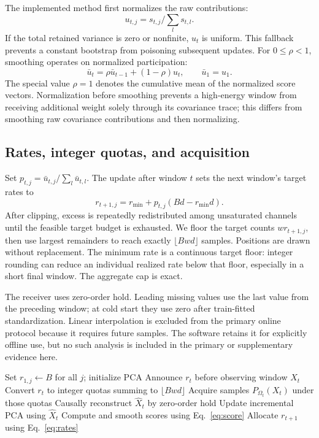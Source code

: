 \documentclass[pdflatex,sn-vancouver-num]{sn-jnl}
\theoremstyle{thmstyleone}
\begin{document}
The implemented method first normalizes the raw contributions:
\begin{equation}
 u_{t,j}=s_{t,j}/\sum_l s_{t,l}.
\end{equation}
If the total retained variance is zero or nonfinite, $u_t$ is uniform. This
fallback prevents a constant bootstrap from poisoning subsequent updates.
For $0\leq\rho<1$, smoothing operates on normalized participation:
\begin{equation}
 \bar u_t=\rho\bar u_{t-1}+(1-\rho)u_t,
 \qquad \bar u_1=u_1.
\end{equation}
The special value $\rho=1$ denotes the cumulative mean of the normalized score
vectors. Normalization before smoothing prevents a high-energy window from
receiving additional weight solely through its covariance trace; this differs
from smoothing raw covariance contributions and then normalizing.

\subsection{Rates, integer quotas, and acquisition}

Set $p_{t,j}=\bar u_{t,j}/\sum_l\bar u_{t,l}$. The update after window $t$
sets the next window's target rates to
\begin{equation}
 r_{t+1,j}=r_{\min}+p_{t,j}(Bd-r_{\min}d).
\label{eq:rates}
\end{equation}
After clipping, excess is repeatedly redistributed among unsaturated channels
until the feasible target budget is exhausted. We floor
the target counts $wr_{t+1,j}$, then use largest remainders to reach exactly
$\lfloor Bwd\rfloor$ samples. Positions are drawn without replacement. The minimum rate is a continuous
target floor: integer rounding can reduce an individual realized rate below
that floor, especially in a short final window. The aggregate cap is exact.

The receiver uses zero-order hold. Leading missing values use the last value
from the preceding window; at cold start they use zero after train-fitted
standardization. Linear interpolation is excluded from the primary online
protocol because it requires future samples. The software retains it for explicitly offline use, but no such analysis is
included in the primary or supplementary evidence here.

\begin{algorithm}[t]
\caption{Causal PCA-guided rate allocation}
\label{alg:causal}
\begin{algorithmic}[1]
\STATE Set $r_{1,j}\gets B$ for all $j$; initialize PCA
  \STATE Announce $r_t$ before observing window $X_t$
  \STATE Convert $r_t$ to integer quotas summing to $\lfloor Bwd\rfloor$
  \STATE Acquire samples $P_{\Omega_t}(X_t)$ under those quotas
  \STATE Causally reconstruct $\widehat X_t$ by zero-order hold
  \STATE Update incremental PCA using $\widehat X_t$
  \STATE Compute and smooth scores using Eq.~\eqref{eq:score}
  \STATE Allocate $r_{t+1}$ using Eq.~\eqref{eq:rates}
\ENDFOR
\end{algorithmic}
\end{algorithm}
\end{document}
